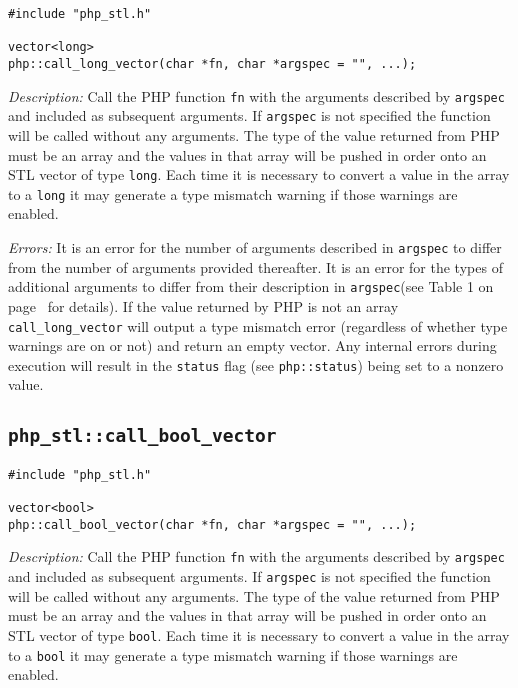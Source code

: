 \documentclass[11pt,titlepage]{article}
\begin{document}
\begin{verbatim}
#include "php_stl.h"

vector<long> 
php::call_long_vector(char *fn, char *argspec = "", ...);
\end{verbatim}

\emph{Description:} Call the PHP function \verb|fn| with the arguments described by \verb|argspec| and included as subsequent arguments. If \verb|argspec| is not specified the function will be called without any arguments. The type of the value returned from PHP must be an array and the values in that array will be pushed in order onto an STL vector of type \verb|long|. Each time it is necessary to convert a value in the array to a \verb|long| it may generate a type mismatch warning if those warnings are enabled.

\emph{Errors:} It is an error for the number of arguments described in \verb|argspec| to differ from the number of arguments provided thereafter. It is an error for the types of additional arguments to differ from their description in \verb|argspec|(see Table 1 on page~\pageref{Table1} for details). If the value returned by PHP is not an array \verb|call_long_vector| will output a type mismatch error (regardless of whether type warnings are on or not) and return an empty vector. Any internal errors during execution will result in the \verb|status| flag (see \verb|php::status|) being set to a nonzero value.


\subsection{\texttt{php\_stl::call\_bool\_vector}}

\begin{verbatim}
#include "php_stl.h"

vector<bool> 
php::call_bool_vector(char *fn, char *argspec = "", ...);
\end{verbatim}

\emph{Description:} Call the PHP function \verb|fn| with the arguments described by \verb|argspec| and included as subsequent arguments. If \verb|argspec| is not specified the function will be called without any arguments. The type of the value returned from PHP must be an array and the values in that array will be pushed in order onto an STL vector of type \verb|bool|. Each time it is necessary to convert a value in the array to a \verb|bool| it may generate a type mismatch warning if those warnings are enabled.
\end{document}
